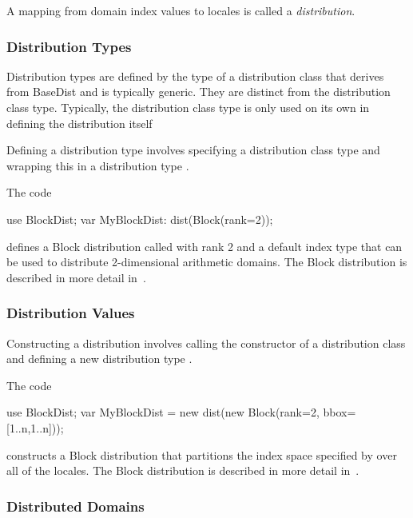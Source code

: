 \label{Domain_Maps}

A mapping from domain index values to locales is called a {\em
distribution}.

\subsubsection{Distribution Types}
\label{Distribution_Types}

Distribution types are defined by the type of a distribution class
that derives from BaseDist and is typically generic.  They are
distinct from the distribution class type.  Typically, the
distribution class type is only used on its own in defining the
distribution itself~

Defining a distribution type involves specifying a distribution class
type and wrapping this in a distribution type .
\begin{example}
The code
\begin{chapel}
use BlockDist;
var MyBlockDist: dist(Block(rank=2));
\end{chapel}
defines a Block distribution called  with rank 2 and
a default index type that can be used to distribute 2-dimensional
arithmetic domains.  The Block distribution is described in more
detail in~.
\end{example}

\subsubsection{Distribution Values}
\label{Distribution_Values}

Constructing a distribution involves calling the constructor of a
distribution class and defining a new distribution type .
\begin{example}
The code
\begin{chapel}
use BlockDist;
var MyBlockDist = new dist(new Block(rank=2, bbox=[1..n,1..n]));
\end{chapel}
constructs a Block distribution that partitions the index space
specified by \chpl{[1..n, 1..n]} over all of the locales.  The Block
distribution is described in more detail in~.
\end{example}

\subsubsection{Distributed Domains}
\label{Distributed_Domains}

